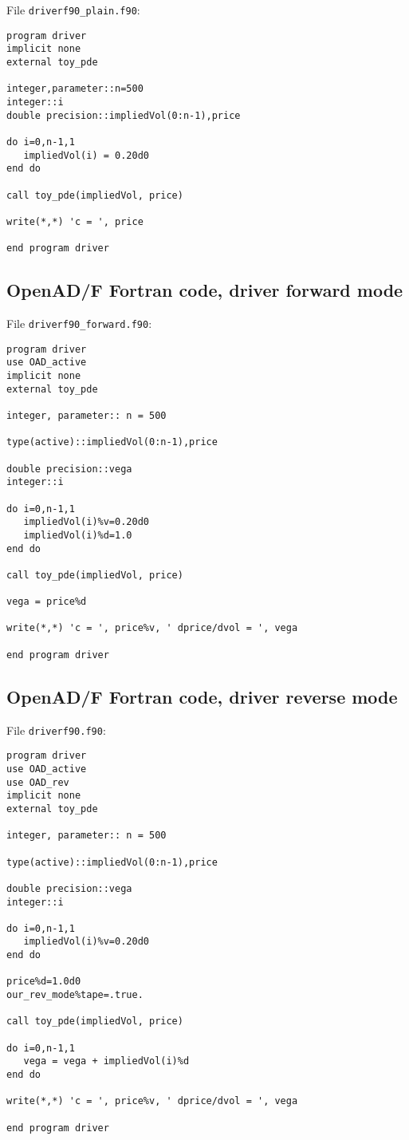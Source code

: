 \documentclass{amsart}
\theoremstyle{plain}
\numberwithin{equation}{section}
\begin{document}
File \verb+driverf90_plain.f90+:

\begin{verbatim}
program driver
implicit none
external toy_pde

integer,parameter::n=500
integer::i
double precision::impliedVol(0:n-1),price

do i=0,n-1,1
   impliedVol(i) = 0.20d0
end do

call toy_pde(impliedVol, price)

write(*,*) 'c = ', price

end program driver
\end{verbatim}

\subsection{OpenAD/F Fortran code, driver forward mode}

File \verb+driverf90_forward.f90+:

\begin{verbatim}
program driver
use OAD_active
implicit none
external toy_pde

integer, parameter:: n = 500

type(active)::impliedVol(0:n-1),price

double precision::vega
integer::i

do i=0,n-1,1
   impliedVol(i)%v=0.20d0
   impliedVol(i)%d=1.0
end do

call toy_pde(impliedVol, price)

vega = price%d

write(*,*) 'c = ', price%v, ' dprice/dvol = ', vega

end program driver
\end{verbatim}

\subsection{OpenAD/F Fortran code, driver reverse mode}

File \verb+driverf90.f90+:

\begin{verbatim}
program driver
use OAD_active
use OAD_rev
implicit none
external toy_pde

integer, parameter:: n = 500

type(active)::impliedVol(0:n-1),price

double precision::vega
integer::i

do i=0,n-1,1
   impliedVol(i)%v=0.20d0
end do

price%d=1.0d0
our_rev_mode%tape=.true.

call toy_pde(impliedVol, price)

do i=0,n-1,1
   vega = vega + impliedVol(i)%d
end do

write(*,*) 'c = ', price%v, ' dprice/dvol = ', vega

end program driver
\end{verbatim}
\end{document}
